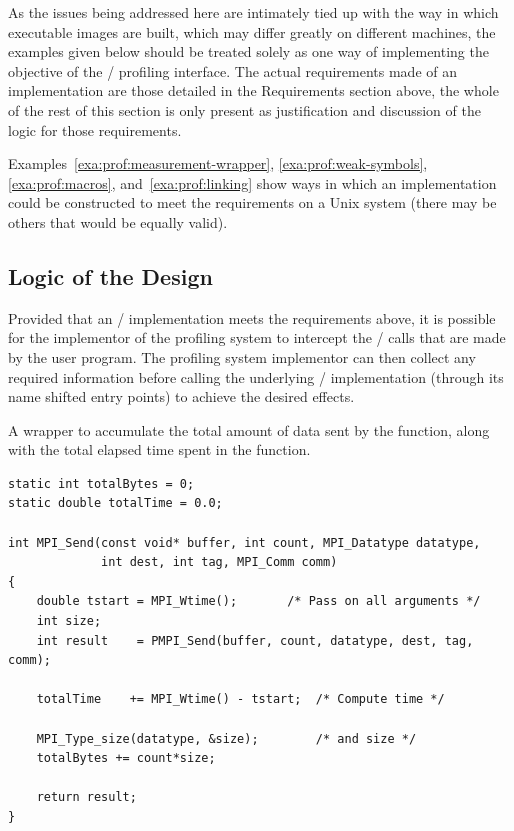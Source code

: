 As the issues being addressed here are intimately tied up with the way in
which executable images are built, which may differ greatly on different
machines, the examples given below should be treated solely as one way of
implementing the objective of the \MPI/ profiling interface.  The actual
requirements made of an implementation are those detailed in the
Requirements section above, the whole of the rest of this section is only
present as justification and discussion of the logic for those
requirements.

Examples~\ref{exa:prof:measurement-wrapper}, \ref{exa:prof:weak-symbols}, \ref{exa:prof:macros}, and~\ref{exa:prof:linking} show ways in which an implementation could be
constructed to meet the requirements on a Unix system (there may be others that would be equally valid).

\subsection{Logic of the Design}

Provided that an \MPI/ implementation meets the requirements above, it is
possible for the implementor of the profiling system to intercept the \MPI/
calls that  are made by the user program.  The profiling system implementor can then collect any required
information before calling the underlying \MPI/ implementation
(through its name shifted entry points) to achieve the desired effects.


\begin{example}
\label{exa:prof:measurement-wrapper}
%
%
A wrapper to accumulate the total amount of data sent by the
 function, along with the total elapsed time spent in
the function.

\begin{lstlisting}[language={[MPI]C}]
static int totalBytes = 0;
static double totalTime = 0.0;

int MPI_Send(const void* buffer, int count, MPI_Datatype datatype,
             int dest, int tag, MPI_Comm comm)
{
    double tstart = MPI_Wtime();       /* Pass on all arguments */
    int size;
    int result    = PMPI_Send(buffer, count, datatype, dest, tag, comm);

    totalTime    += MPI_Wtime() - tstart;  /* Compute time */

    MPI_Type_size(datatype, &size);        /* and size */
    totalBytes += count*size;

    return result;
}
\end{lstlisting}
\end{example}

